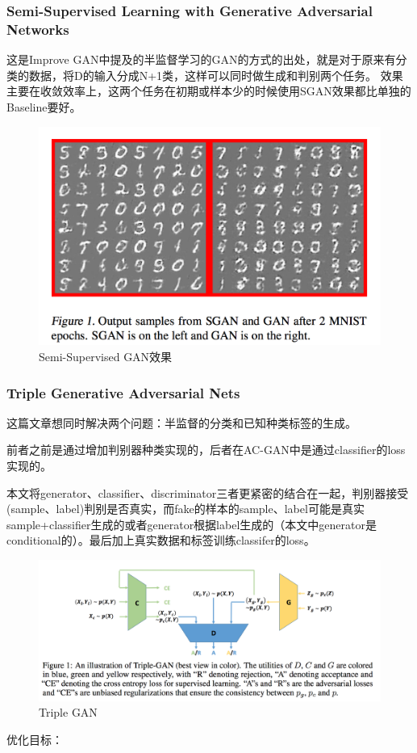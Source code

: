 \documentclass[a4paper]{article}
\begin{document}
\subsubsection{Semi-Supervised Learning with Generative Adversarial Networks\cite{DBLP:journals/corr/Odena16a}}
这是Improve GAN中提及的半监督学习的GAN的方式的出处，就是对于原来有分类的数据，将D的输入分成N+1类，这样可以同时做生成和判别两个任务。
效果主要在收敛效率上，这两个任务在初期或样本少的时候使用SGAN效果都比单独的Baseline要好。
\begin{figure}
\centering
\includegraphics[width=\textwidth]{./img/20.png}
\caption{Semi-Supervised GAN效果}
\label{fig:20}
\end{figure}
\subsubsection{Triple Generative Adversarial Nets\cite{DBLP:journals/corr/LiXZZ17}}
这篇文章想同时解决两个问题：半监督的分类和已知种类标签的生成。

前者之前是通过增加判别器种类实现的，后者在AC-GAN中是通过classifier的loss实现的。

本文将generator、classifier、discriminator三者更紧密的结合在一起，判别器接受(sample、label)判别是否真实，而fake的样本的sample、label可能是真实sample+classifier生成的或者generator根据label生成的（本文中generator是conditional的）。最后加上真实数据和标签训练classifer的loss。
\begin{figure}
\centering
\includegraphics[width=\textwidth]{./img/32.png}
\caption{Triple GAN}
\label{fig:32}
\end{figure}
优化目标：
\end{document}
